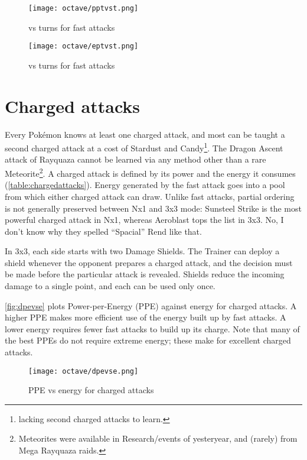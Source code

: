 \begin{figure}[ht]
\texttt{[image: octave/pptvst.png]}
  \caption{\PPT{} vs turns for fast attacks\label{fig:pptvst}}
\end{figure}

\begin{figure}[hb]
\texttt{[image: octave/eptvst.png]}
  \caption{\EPT{} vs turns for fast attacks\label{fig:eptvst}}
\end{figure}

\section{Charged attacks\label{sec:charged}}
Every Pokémon knows at least one charged attack, and most can be taught a second
  charged attack at a cost of Stardust and Candy\footnote{
  lacking second charged attacks to learn.}.
The Dragon Ascent attack of Rayquaza cannot be learned via any method other
  than a rare Meteorite\footnote{Meteorites were available in Research/events of yesteryear, and (rarely) from Mega Rayquaza raids.}.
A charged attack is defined by its power and the energy it consumes (\autoref{table:chargedattacks}).
Energy generated by the fast attack goes into a pool from which either charged attack can draw.
Unlike fast attacks, partial ordering is not generally preserved between Nx1 and 3x3 mode:
  Sunsteel Strike is the most powerful charged attack in Nx1, whereas Aeroblast tops
  the list in 3x3.
No, I don't know why they spelled ``Spacial'' Rend like that.


In 3x3, each side starts with two Damage Shields.
The Trainer can deploy a shield whenever the opponent prepares a charged attack,
   and the decision must be made before the particular attack is revealed.
Shields reduce the incoming damage to a single point, and each can be used only once.

\autoref{fig:dpevse} plots Power-per-Energy (PPE) against energy for charged attacks.
A higher PPE makes more efficient use of the energy built up by fast attacks.
A lower energy requires fewer fast attacks to build up its charge.
Note that many of the best PPEs do not require extreme energy; these make
 for excellent charged attacks.
\begin{figure}[ht]
\texttt{[image: octave/dpevse.png]}
  \caption{PPE vs energy for charged attacks\label{fig:dpevse}}
\end{figure}

